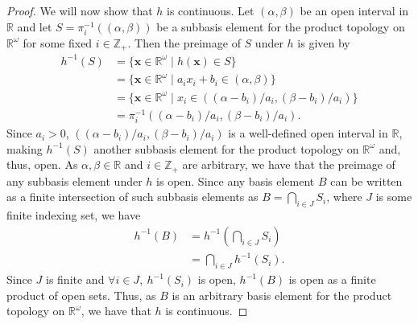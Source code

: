 \documentclass[a4paper,10pt]{article}
\newcommand{\bx}{\mathbf{x}}
\newcommand{\inv}{^{-1}}
\newcommand{\ZZ}{\mathbb{Z}}
\newcommand{\RR}{\mathbb{R}}
\begin{document}
\begin{solution}
\begin{proof}
        We will now show that $h$ is continuous.
        Let $(\alpha, \beta)$ be an open interval in $\RR$ and let $S = \pi_i\inv\left((\alpha, \beta)\right)$ be a subbasis element for the product topology on $\RR^\omega$ for some fixed $i \in \ZZ_+$.
        Then the preimage of $S$ under $h$ is given by
        \begin{align*}
            h\inv(S)    &= \{\bx \in \RR^\omega \mid h(\bx) \in S\} \\
                        &= \{\bx \in \RR^\omega \mid a_i x_i + b_i \in (\alpha, \beta)\} \\
                        &= \{\bx \in \RR^\omega \mid x_i \in \left((\alpha - b_i) / a_i, (\beta - b_i) / a_i\right)\} \\
                        &= \pi_i\inv\left((\alpha - b_i) / a_i, (\beta - b_i) / a_i\right).
        \end{align*}
        Since $a_i > 0$, $\left((\alpha - b_i) / a_i, (\beta - b_i) / a_i\right)$ is a well-defined open interval in $\RR$, making $h\inv(S)$ another subbasis element for the product topology on $\RR^\omega$ and, thus, open.
        As $\alpha, \beta \in \RR$ and $i \in \ZZ_+$ are arbitrary, we have that the preimage of any subbasis element under $h$ is open.
        Since any basis element $B$ can be written as a finite intersection of such subbasis elements as $B = \bigcap_{i \in J} S_i$, where $J$ is some finite indexing set, we have
        \begin{align*}
            h\inv(B)    &= h\inv\left(\bigcap_{i \in J} S_i\right) \\
                        &= \bigcap_{i \in J} h\inv(S_i).
        \end{align*}
        Since $J$ is finite and $\forall i \in J,~ h\inv(S_i)$ is open, $h\inv(B)$ is open as a finite product of open sets.
        Thus, as $B$ is an arbitrary basis element for the product topology on $\RR^\omega$, we have that $h$ is continuous.


\end{proof}
\end{solution}
\end{document}
